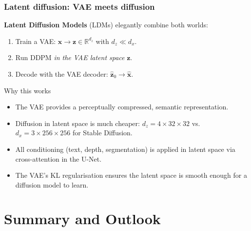 \documentclass{beamer}
\newcommand{\R}{\mathbb{R}}
\begin{document}
\begin{frame}
\frametitle{Latent diffusion: VAE meets diffusion}

\textbf{Latent Diffusion Models} (LDMs) elegantly combine both worlds:

\begin{enumerate}
  \item Train a VAE: $\bm{x}\to\bm{z}\in\R^{d_z}$ with $d_z \ll d_x$.
  \item Run DDPM \emph{in the VAE latent space} $\bm{z}$.
  \item Decode with the VAE decoder: $\hat{\bm{z}}_0\to\hat{\bm{x}}$.
\end{enumerate}

\begin{block}{Why this works}
\begin{itemize}
  \item The VAE provides a perceptually compressed, semantic representation.
  \item Diffusion in latent space is much cheaper: $d_z = 4\times 32\times 32$
        vs.\ $d_x = 3\times 256\times 256$ for Stable Diffusion.
  \item All conditioning (text, depth, segmentation) is applied in latent space
        via cross-attention in the U-Net.
  \item The VAE's KL regularisation ensures the latent space is smooth enough
        for a diffusion model to learn.
\end{itemize}
\end{block}
\end{frame}

\section{Summary and Outlook}
\end{document}
